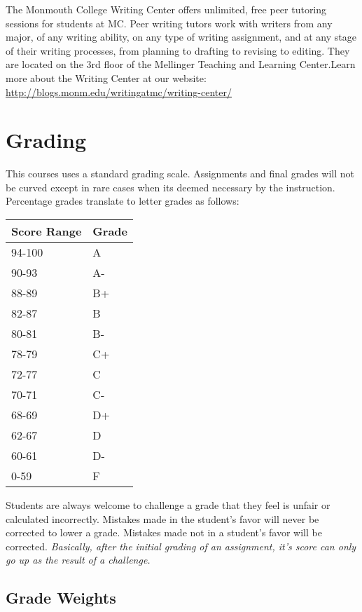 \documentclass[]{tufte-handout}
\begin{document}
The Monmouth College Writing Center offers unlimited, free peer tutoring sessions for students at MC.  Peer writing tutors work with writers from any major, of any writing ability, on any type of writing assignment, and at any stage of their writing processes, from planning to drafting to revising to editing.  They are located on the 3rd floor of the Mellinger Teaching and Learning Center.Learn more about the Writing Center at our website: \url{http://blogs.monm.edu/writingatmc/writing-center/}

\section{Grading}

This courses uses a standard grading scale.  Assignments and final grades will not be curved except in rare cases when its deemed necessary by the instruction.  Percentage grades translate to letter grades as follows:
\newline
\begin{center}
\begin{small}
\begin{tabular}{ll}
Score Range & Grade \\ \hline
94-100 & A \\
90-93 & A- \\
88-89 & B+ \\
82-87 & B \\
80-81 & B- \\
78-79 & C+ \\
72-77 & C \\
70-71 & C- \\
68-69 & D+ \\
62-67 & D \\
60-61 & D- \\
0-59 & F 
\end{tabular}
\end{small}
\end{center}


Students are always welcome to challenge a grade that they feel is unfair or calculated incorrectly.  Mistakes made in the student's favor will never be corrected to lower a grade.  Mistakes made not in a student's favor will be corrected.  \textit{Basically, after the initial grading of an assignment, it's score can only go up as the result of a challenge.}


\subsection{Grade Weights}
\end{document}
